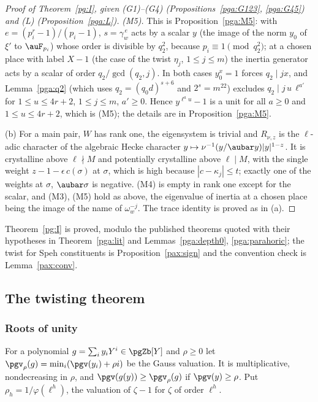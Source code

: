 \documentclass[10pt]{amsart}
\theoremstyle{definition}
\theoremstyle{remark}
\begin{document}
\begin{proof}[Proof of Theorem~\ref{pg:I}, given {\rm(G1)--(G4)} (Propositions~\ref{pga:G123}, \ref{pga:G45}) and {\rm(L)} (Proposition~\ref{pga:L})]
\emph{{\rm(M5)}.} This is Proposition~\ref{pga:M5}: with $e=(p_i^r-1)/(p_i-1)$, $s=\gamma_w^{\,e}$
acts by a scalar $y$ (the image of the norm $y_0$ of $\xi'$ to $\auF_{p_i}$) whose order is
divisible by $q_2^2$, because $p_i\equiv1\pmod{q_2^2}$; at a chosen place with label $X-1$ (the
case of the twist $\eta_j$, $1\le j\le m$) the inertia generator acts by a scalar of order
$q_2/\gcd(q_2,j)$. In both cases $y_0^x=1$ forces $q_2\mid jx$, and Lemma~\ref{pga:q2} (which
uses $q_2=(q_0d)^{s+6}$ and $2^s=m^{22}$) excludes $q_2\mid j\,u\,\ell^{a'}$ for $1\le u\le4r+2$,
$1\le j\le m$, $a'\ge0$. Hence $y^{\ell^a u}-1$ is a unit for all $a\ge0$ and $1\le u\le4r+2$,
which is (M5); the details are in Proposition~\ref{pga:M5}.

(b) For a main pair, $W$ has rank one, the eigensystem is trivial and $R_{\nu,z}$ is the
$\ell$-adic character of the algebraic Hecke character $y\mapsto\nu^{-1}(y/\aubar y)|y|^{1-z}$. It
is crystalline above $\ell\nmid M$ and potentially crystalline above $\ell\mid M$, with the single
weight $z-1-\epsilon\,c(\sigma)$ at $\sigma$, which is high because $|c-\kappa_j|\le t$; exactly
one of the weights at $\sigma$, $\aubar\sigma$ is negative. (M4) is empty in rank one except for
the scalar, and (M3), (M5) hold as above, the eigenvalue of inertia at a chosen place being the
image of the name of $\omega_w^{-j}$. The trace identity is proved as in (a).
\end{proof}

\noindent Theorem~\ref{pg:I} is proved, modulo the published theorems quoted with their hypotheses in
Theorem~\ref{pga:lit} and Lemmas~\ref{pga:depth0}, \ref{pga:parahoric}; the twist for Speh
constituents is Proposition~\ref{pax:sign} and the convention check is Lemma~\ref{pax:conv}.\par\smallskip

\subsection{The twisting theorem}\label{pg:ss-twisting}

\subsubsection*{Roots of unity}
For a polynomial $g=\sum_iy_iY^i\in\pgZb[Y]$ and $\rho\ge0$ let $\pgv_\rho(g)=\min_i(\pgv(y_i)+
\rho i)$ be the Gauss valuation. It is multiplicative, nondecreasing in $\rho$, and
$\pgv(g(y))\ge\pgv_{\rho}(g)$ if $\pgv(y)\ge\rho$. Put $\rho_h=1/\varphi(\ell^h)$, the valuation
of $\zeta-1$ for $\zeta$ of order $\ell^h$.
\end{document}
